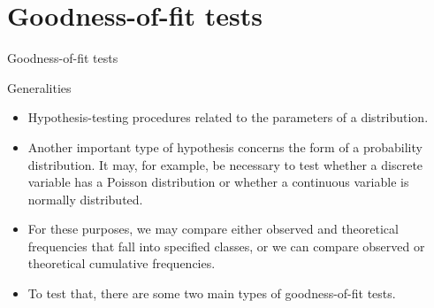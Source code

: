 \documentclass[8pt]{beamer}
\renewcommand{\emph}[1]{\textcolor{myorange}{#1}}
\begin{document}
\section{Goodness-of-fit tests}
\begin{frame}{Goodness-of-fit tests}

    \begin{block}{Generalities}
    \end{block}
        \begin{itemize}
            \item \emph{Hypothesis-testing} procedures related to the \emph{parameters} of a distribution.
            \item Another important type of hypothesis concerns the \emph{form of a probability distribution}. It may, for example, be necessary to test whether a \emph{discrete variable} has a \emph{Poisson distribution} or whether a \emph{continuous variable} is \emph{normally distributed}.
            \item For these purposes, we may compare either \emph{observed} and \emph{theoretical frequencies} that fall into specified classes, or we can compare observed or theoretical \emph{cumulative frequencies}.
            \item To test that, there are some two main types of \alert{goodness-of-fit tests}.
        \end{itemize}

    \end{frame}
\end{document}
